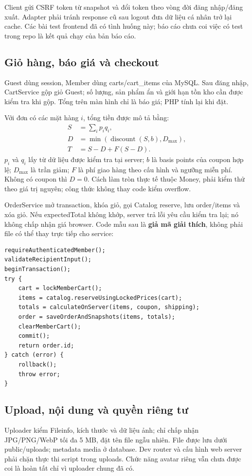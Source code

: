 Client gửi CSRF token từ snapshot và đổi token theo vòng đời đăng nhập/đăng xuất. Adapter phải tránh response cũ sau logout đưa dữ liệu cá nhân trở lại cache. Các bài test frontend đã có tình huống này; báo cáo chưa coi việc có test trong repo là kết quả chạy của bản báo cáo.

\subsection{Giỏ hàng, báo giá và checkout}
Guest dùng session, Member dùng carts/cart\_items của MySQL. Sau đăng nhập, CartService gộp giỏ Guest; số lượng, sản phẩm ẩn và giới hạn tồn kho cần được kiểm tra khi gộp. Tổng trên màn hình chỉ là báo giá; PHP tính lại khi đặt.

Với đơn có các mặt hàng $i$, tổng tiền được mô tả bằng:
\begin{align}
S &= \sum_i p_iq_i,\\
D &= \min\left(\operatorname{discount}(S,b),D_{\max}\right),\\
T &= S-D+F(S-D).
\end{align}
$p_i$ và $q_i$ lấy từ dữ liệu được kiểm tra tại server; $b$ là basis points của coupon hợp lệ; $D_{\max}$ là trần giảm; $F$ là phí giao hàng theo cấu hình và ngưỡng miễn phí. Không có coupon thì $D=0$. Cách làm tròn thực tế thuộc Money, phải kiểm thử theo giá trị nguyên; công thức không thay code kiểm overflow.

OrderService mở transaction, khóa giỏ, gọi Catalog reserve, lưu order/items và xóa giỏ. Nếu expectedTotal không khớp, server trả lỗi yêu cầu kiểm tra lại; nó không chấp nhận giá browser. Code mẫu sau là \textbf{giả mã giải thích}, không phải file có thể thay trực tiếp cho service:
\begin{lstlisting}[caption={Giả mã mô tả ranh giới transaction}]
requireAuthenticatedMember();
validateRecipientInput();
beginTransaction();
try {
    cart = lockMemberCart();
    items = catalog.reserveUsingLockedPrices(cart);
    totals = calculateOnServer(items, coupon, shipping);
    order = saveOrderAndSnapshots(items, totals);
    clearMemberCart();
    commit();
    return order.id;
} catch (error) {
    rollback();
    throw error;
}
\end{lstlisting}

\subsection{Upload, nội dung và quyền riêng tư}
Uploader kiểm Fileinfo, kích thước và dữ liệu ảnh; chỉ chấp nhận JPG/PNG/WebP tối đa 5 MB, đặt tên file ngẫu nhiên. File được lưu dưới public/uploads; metadata media ở database. Dev router và cấu hình web server phải chặn thực thi script trong uploads. Chức năng avatar riêng vẫn chưa được coi là hoàn tất chỉ vì uploader chung đã có.

